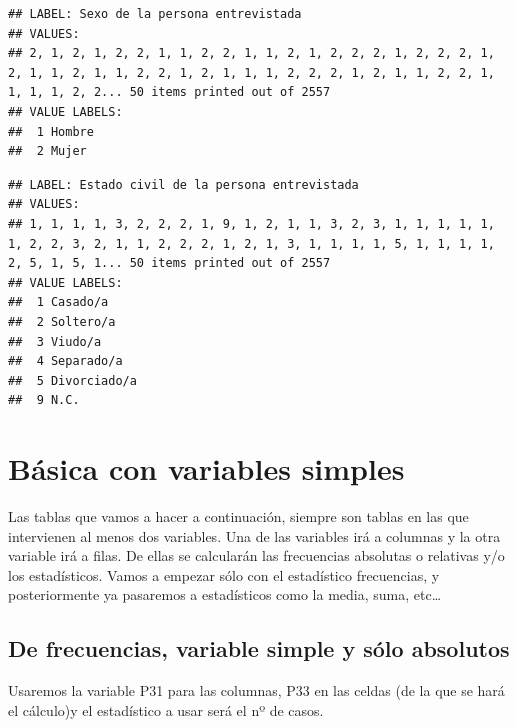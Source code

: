 \documentclass[
]{book}
\newenvironment{Shaded}{\begin{snugshade}}{\end{snugshade}}
\newcommand{\NormalTok}[1]{#1}
\newcommand{\SpecialCharTok}[1]{\textcolor[rgb]{0.00,0.00,0.00}{#1}}
\begin{document}
\begin{verbatim}
## LABEL: Sexo de la persona entrevistada 
## VALUES:
## 2, 1, 2, 1, 2, 2, 1, 1, 2, 2, 1, 1, 2, 1, 2, 2, 2, 1, 2, 2, 2, 1, 2, 1, 1, 2, 1, 1, 2, 2, 1, 2, 1, 1, 1, 2, 2, 2, 1, 2, 1, 1, 2, 2, 1, 1, 1, 1, 2, 2... 50 items printed out of 2557 
## VALUE LABELS:         
##  1 Hombre
##  2 Mujer
\end{verbatim}

\begin{Shaded}
\end{Shaded}

\begin{verbatim}
## LABEL: Estado civil de la persona entrevistada 
## VALUES:
## 1, 1, 1, 1, 3, 2, 2, 2, 1, 9, 1, 2, 1, 1, 3, 2, 3, 1, 1, 1, 1, 1, 1, 2, 2, 3, 2, 1, 1, 2, 2, 2, 1, 2, 1, 3, 1, 1, 1, 1, 5, 1, 1, 1, 1, 2, 5, 1, 5, 1... 50 items printed out of 2557 
## VALUE LABELS:               
##  1 Casado/a    
##  2 Soltero/a   
##  3 Viudo/a     
##  4 Separado/a  
##  5 Divorciado/a
##  9 N.C.
\end{verbatim}

\hypertarget{buxe1sica-con-variables-simples}{%
\section{Básica con variables simples}\label{buxe1sica-con-variables-simples}}

Las tablas que vamos a hacer a continuación, siempre son tablas en las que intervienen al menos dos variables. Una de las variables irá a columnas y la otra variable irá a filas. De ellas se calcularán las frecuencias absolutas o relativas y/o los estadísticos. Vamos a empezar sólo con el estadístico frecuencias, y posteriormente ya pasaremos a estadísticos como la media, suma, etc\ldots{}

\hypertarget{de-frecuencias-variable-simple-y-suxf3lo-absolutos}{%
\subsection{De frecuencias, variable simple y sólo absolutos}\label{de-frecuencias-variable-simple-y-suxf3lo-absolutos}}

Usaremos la variable P31 para las columnas, P33 en las celdas (de la que se hará el cálculo)y el estadístico a usar será el nº de casos.
\end{document}
